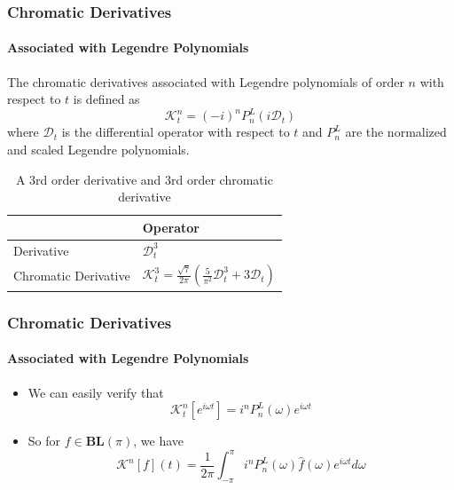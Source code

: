\documentclass{beamer}
\begin{document}
\begin{frame}
\frametitle{Chromatic Derivatives}
\framesubtitle{Associated with Legendre Polynomials}
The chromatic derivatives associated with Legendre polynomials of order $n$ 
with respect to $t$ is defined as
\begin{equation}
	\mathcal{K}_t^n = (-i)^n P_n^L(i\mathcal{D}_t)
\end{equation}
where $\mathcal{D}_t$ is the differential operator with respect to $t$ and
$P_n^L$ are the normalized and scaled Legendre polynomials.
\pause
\begin{example}
\begin{table}
\begin{tabular}{l l}
 & Operator \\
\midrule
Derivative & $\mathcal{D}_t^3$ \\
Chromatic Derivative & $\mathcal{K}_t^3 = \frac{\sqrt{7}}{2\pi} \left ( \frac{5}{\pi^2} \mathcal{D}_t^3 + 3 \mathcal{D}_t \right )$ \\
\bottomrule
\end{tabular}
\caption{A 3rd order derivative and 3rd order chromatic derivative}
\end{table}
\end{example}
\end{frame}


\begin{frame}
\frametitle{Chromatic Derivatives}
\framesubtitle{Associated with Legendre Polynomials}
\begin{itemize}
	\item We can easily verify that
		\begin{equation*}
			\mathcal{K}_t^n[e^{i\omega t}] = i^n P_n^L(\omega) e^{i\omega t}
		\end{equation*}
	\item So for $f \in \mathbf{BL}(\pi)$, we have
		\begin{equation}
			\mathcal{K}^n[f](t) = \frac{1}{2\pi} \int_{-\pi}^{\pi} i^n P_n^L(\omega) \hat{f}(\omega) e^{i\omega t} d\omega
		\end{equation}
\end{itemize}
\end{frame}

\end{document}

